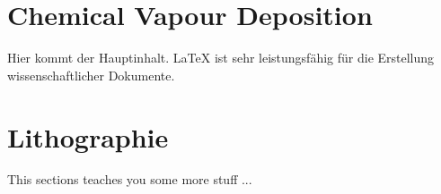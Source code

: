 \documentclass{article} %
\begin{document}

\vspace{1em}
\section{Chemical Vapour Deposition} %
Hier kommt der Hauptinhalt. \LaTeX{} ist sehr leistungsfähig für die Erstellung wissenschaftlicher Dokumente.

\vspace{1em}
\section{Lithographie} %
This sections teaches you some more stuff ...

\newpage
\end{document}
